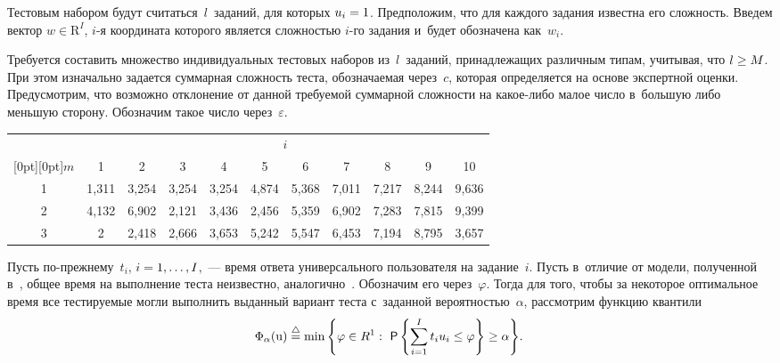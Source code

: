 \begin{multicols}{2}
    Тестовым набором будут считаться~$l$~заданий, для которых $u_i\hm=1$. 
Предположим, что для каждого задания известна его сложность. Введем вектор 
${w}\in \mathrm{R}^I$, $i$-я координата которого является слож\-ностью 
$i$-го задания и~будет обозначена как~$w_i$.
    
    Требуется составить множество индивидуальных тестовых наборов 
из~$l$~заданий, принадлежащих различным типам, учитывая, что $l\hm\geq 
M$. При этом изначально задается суммарная сложность тес\-та, обозначаемая 
через~$c$, которая определяется на основе экспертной оценки. Предусмотрим, 
что возможно отклонение от данной требуемой суммарной сложности на 
 ка\-кое-ли\-бо малое число в~большую либо меньшую сторону. Обозначим 
такое число через~$\varepsilon$.

    \begin{table*}[b]\small %
    \begin{center}
     \vspace*{2ex}
     
     \begin{tabular}{|c|c|c|c|c|c|c|c|c|c|c|}
     \hline
     &\multicolumn{10}{c|}{$i$}\\
     \cline{2-11}
\multicolumn{1}{|c|}{\raisebox{6pt}[0pt][0pt]{$m$}}&1&2&3&4&5&6&7&8&9&10\\
\hline
1&1,311&3,254&3,254&3,254&4,874&5,368&7,011&7,217&8,244&9,636\\
2&4,132&6,902&2,121&3,436&2,456&5,359&6,902&7,283&7,815&9,399\\
3&2\hphantom{,999}&2,418&2,666&3,653&5,242&5,547&6,453&7,194&8,795&3,657\\
\hline
\end{tabular}
\end{center}
\end{table*}
     
    
    Пусть по-прежнему~$t_i$, $i\hm=1,\ldots , I$,~--- время ответа 
универсального пользователя на задание~$i$. Пусть в~отличие от модели, 
полученной в~\cite{8-b}, общее время на выполнение теста неизвестно, 
аналогично~\cite{9-b}. Обозначим его через~$\varphi$. Тогда для того, чтобы за 
некоторое оптимальное время все тестируемые могли выполнить выданный 
вариант теста с~заданной вероятностью~$\alpha$, рассмотрим функцию 
квантили
    \begin{equation}
    \hspace*{-2mm}\Phi_\alpha(\mathrm{u}) \eqdelta \min \left\{ \varphi\in {R}^1:\
   {\sf P}\left\{ \sum\limits^I_{i=1} t_i u_i\leq 
   \varphi\right\}\geq \alpha\right\}\!.\!\!
    \label{e1-b}
    \end{equation}
    

\end{multicols}
